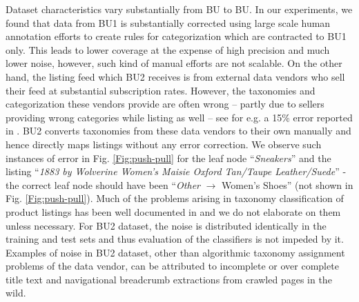 \vspace{-0.2cm}

Dataset characteristics vary substantially from BU to BU.
In our experiments, we found that data from BU1 is substantially corrected using large scale human annotation efforts to create rules for categorization which are contracted to BU1 only.
This leads to lower coverage at the expense of high precision and much lower noise, however, such kind of manual efforts are not scalable.
On the other hand, the listing feed which BU2 receives is from external data vendors who sell their feed at substantial subscription rates. 
However, the taxonomies and categorization these vendors provide are often wrong -- partly due to sellers providing wrong categories while listing as well -- see for e.g. a 15\% error reported in \cite{Shen12}.
BU2 converts taxonomies from these data vendors to their own manually and hence directly maps listings without any error correction.
We observe such instances of error in Fig. \ref{Fig:push-pull} for the leaf node ``\textit{Sneakers}'' and the listing ``\textit{1883 by Wolverine Women's Maisie Oxford Tan/Taupe Leather/Suede}'' - the correct leaf node should have been ``\textit{Other} $\rightarrow$ Women's Shoes'' (not shown in Fig. \ref{Fig:push-pull}).
Much of the problems arising in taxonomy classification of product listings has been well documented in \cite{Sun14, Shen12, Pyo16} and we do not elaborate on them unless necessary.
For BU2 dataset, the noise is distributed identically in the training and test sets and thus evaluation of the classifiers is not impeded by it.
Examples of noise in BU2 dataset, other than algorithmic taxonomy assignment problems of the data vendor, can be attributed to incomplete or over complete title text and navigational breadcrumb extractions from crawled pages in the wild.

